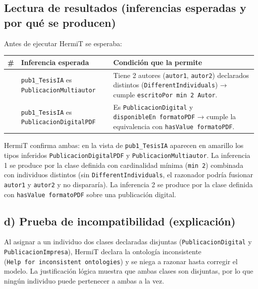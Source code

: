 \subsection{Lectura de resultados (inferencias esperadas y por qué se
producen)}\label{lectura-de-resultados-inferencias-esperadas-y-por-quuxe9-se-producen}

Antes de ejecutar HermiT se esperaba:

{\def\LTcaptype{none} %
\begin{longtable}[]{@{}
  >{\raggedright\arraybackslash}p{}
  >{\raggedright\arraybackslash}p{}
  >{\raggedright\arraybackslash}p{}@{}}
\toprule\noalign{}
\begin{minipage}[b]{\linewidth}\raggedright
\#
\end{minipage} & \begin{minipage}[b]{\linewidth}\raggedright
Inferencia esperada
\end{minipage} & \begin{minipage}[b]{\linewidth}\raggedright
Condición que la permite
\end{minipage} \\
\midrule\noalign{}
\endhead
\bottomrule\noalign{}
\endlastfoot
1 & \texttt{pub1\_TesisIA} es \texttt{PublicacionMultiautor} & Tiene 2
autores (\texttt{autor1}, \texttt{autor2}) declarados distintos
(\texttt{DifferentIndividuals}) → cumple
\texttt{escritoPor\ min\ 2\ Autor}. \\
2 & \texttt{pub1\_TesisIA} es \texttt{PublicacionDigitalPDF} & Es
\texttt{PublicacionDigital} y \texttt{disponibleEn\ formatoPDF} → cumple
la equivalencia con \texttt{hasValue\ formatoPDF}. \\
\end{longtable}
}

HermiT confirma ambas: en la vista de \texttt{pub1\_TesisIA} aparecen en
amarillo los tipos inferidos \texttt{PublicacionDigitalPDF} y
\texttt{PublicacionMultiautor}. La inferencia 1 se produce por la clase
definida con cardinalidad mínima (\texttt{min\ 2}) combinada con
individuos distintos (sin \texttt{DifferentIndividuals}, el razonador
podría fusionar \texttt{autor1} y \texttt{autor2} y no dispararía). La
inferencia 2 se produce por la clase definida con
\texttt{hasValue\ formatoPDF} sobre una publicación digital.

\subsection{d) Prueba de incompatibilidad
(explicación)}\label{d-prueba-de-incompatibilidad-explicaciuxf3n}

Al asignar a un individuo dos clases declaradas disjuntas
(\texttt{PublicacionDigital} y \texttt{PublicacionImpresa}), HermiT
declara la ontología inconsistente
(\texttt{Help\ for\ inconsistent\ ontologies}) y se niega a razonar
hasta corregir el modelo. La justificación lógica muestra que ambas
clases son disjuntas, por lo que ningún individuo puede pertenecer a
ambas a la vez.
